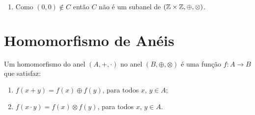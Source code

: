 \begin{exemplo}
\begin{solucao}
\begin{enumerate}[label=({\alph*})]
                Agora observe que de \eqref{primeira_condicao} segue que $a$ e $b$ devem ter a mesma paridade, isto é, $a$ e $b$ são
                ambos pares ou ambos ímpares. De modo análogo, de \eqref{segunda_condicao}, o mesmo ocorre com $c$ e $d$. Assim se $a$ e $b$ ou $c$ e $d$ são pares, então
                \[
                    (ac - bd) + (ad + bc)
                \]
                é sempre um número par.

                Agora se $a$, $b$, $c$ e $d$ são todos ímpares, então $ac$, $bd$, $ad$ e $bc$ também são ímpares e daí
                \[
                    (ac - bd) + (ad + bc)
                \]
                é par. Logo $(a, b) \otimes (c, d) \in B$.

                Portanto $B$ é um subanel de $(\z \times \z, \oplus, \otimes)$.

            \item Como $(0, 0) \notin C$ então $C$ não é um subanel de $(\z \times \z, \oplus, \otimes)$.


        \end{enumerate}
    \end{solucao}
\end{exemplo}


\section{Homomorfismo de An\'eis} %
\label{sec:homomorfismo_de_aneis}

\begin{definicao}
	Um homomorfismo do anel $(A, +, \cdot)$ no anel $(B, \oplus, \otimes)$ {\'e} uma fun{\c c}{\~a}o $f : A \to B$ que satisfaz:
	\begin{enumerate}[label={\roman*})]
		\item $f(x + y) = f(x) \oplus f(y)$, para todos $x$, $y \in A$;
		\item $f(x \cdot y) = f(x)\otimes f(y)$, para todos $x$, $y \in A$.
	\end{enumerate}
\end{definicao}

